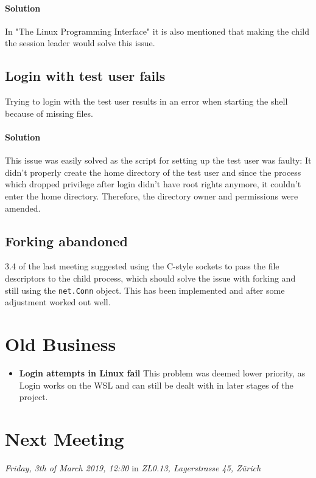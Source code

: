 \documentclass[10pt,a4paper,twoside,english,minutes]{zhawreprt}
\begin{document}
\paragraph{Solution}
In "The Linux Programming Interface" it is also mentioned that making the child the session leader would solve this issue.

\subsection{Login with test user fails}
Trying to login with the test user results in an error when starting the shell because of missing files.
\paragraph{Solution}
This issue was easily solved as the script for setting up the test user was faulty: It didn't properly create the home directory of the test user and since the process which dropped privilege after login didn't have root rights anymore, it couldn't enter the home directory. Therefore, the directory owner and permissions were amended.

\subsection{Forking abandoned}
3.4 of the last meeting suggested using the C-style sockets to pass the file descriptors to the child process, which should solve the issue with forking and still using the \texttt{net.Conn} object. This has been implemented and after some adjustment worked out well.

\section{Old Business}
\begin{itemize}
\item \textbf{Login attempts in Linux fail} This problem was deemed lower priority, as Login works on the WSL and can still be dealt with in later stages of the project.
\end{itemize}

\section*{Next Meeting}
\textit{Friday, 3th of March 2019, 12:30} in \textit{ZL0.13, Lagerstrasse 45, Zürich}
\end{document}
